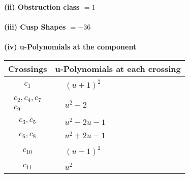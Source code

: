 \documentclass[1p]{elsarticle_modified}
\theoremstyle{definition}
\begin{document}
\flushleft \textbf{(ii) Obstruction class $= 1$}\\~\\
\flushleft \textbf{(iii) Cusp Shapes $= -36$}\\~\\
\newpage\renewcommand{\arraystretch}{1}
\flushleft \textbf{(iv) u-Polynomials at the component}\newline \\
\begin{tabular}{m{50pt}|m{274pt}}
Crossings & \hspace{64pt}u-Polynomials at each crossing \\
\hline $$\begin{aligned}c_{1}\end{aligned}$$&$\begin{aligned}
&(u+1)^2
\end{aligned}$\\
\hline $$\begin{aligned}c_{2},c_{4},c_{7}\\c_{9}\end{aligned}$$&$\begin{aligned}
&u^2-2
\end{aligned}$\\
\hline $$\begin{aligned}c_{3},c_{5}\end{aligned}$$&$\begin{aligned}
&u^2-2 u-1
\end{aligned}$\\
\hline $$\begin{aligned}c_{6},c_{8}\end{aligned}$$&$\begin{aligned}
&u^2+2 u-1
\end{aligned}$\\
\hline $$\begin{aligned}c_{10}\end{aligned}$$&$\begin{aligned}
&(u-1)^2
\end{aligned}$\\
\hline $$\begin{aligned}c_{11}\end{aligned}$$&$\begin{aligned}
&u^2
\end{aligned}$\\
\hline
\end{tabular}\\~\\
\end{document}
